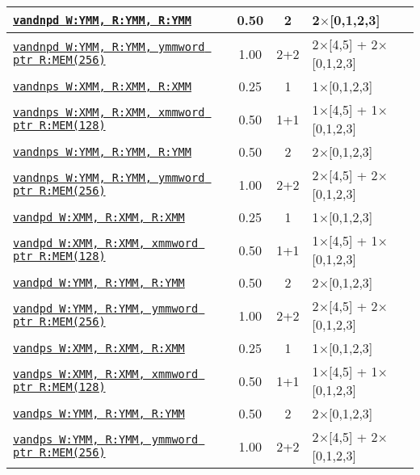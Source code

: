 \documentclass[a4paper,english,fontsize=9]{scrartcl}
\begin{document}
\begin{longtable}{p{}ccL{.25\textwidth}}
  \midrule
  \texttt{\href{https://felixcloutier.com/x86/ANDNPD.html}{vandnpd W:YMM, R:YMM, R:YMM}} & 0.50 & 2 & 2\(\times\)[0,1,2,3] \\
  \midrule
  \texttt{\href{https://felixcloutier.com/x86/ANDNPD.html}{vandnpd W:YMM, R:YMM, ymmword ptr R:MEM(256)}} & 1.00 & 2+2 & 2\(\times\)[4,5] + 2\(\times\)[0,1,2,3] \\
  \midrule
  \texttt{\href{https://felixcloutier.com/x86/ANDNPS.html}{vandnps W:XMM, R:XMM, R:XMM}} & 0.25 & 1 & 1\(\times\)[0,1,2,3] \\
  \midrule
  \texttt{\href{https://felixcloutier.com/x86/ANDNPS.html}{vandnps W:XMM, R:XMM, xmmword ptr R:MEM(128)}} & 0.50 & 1+1 & 1\(\times\)[4,5] + 1\(\times\)[0,1,2,3] \\
  \midrule
  \texttt{\href{https://felixcloutier.com/x86/ANDNPS.html}{vandnps W:YMM, R:YMM, R:YMM}} & 0.50 & 2 & 2\(\times\)[0,1,2,3] \\
  \midrule
  \texttt{\href{https://felixcloutier.com/x86/ANDNPS.html}{vandnps W:YMM, R:YMM, ymmword ptr R:MEM(256)}} & 1.00 & 2+2 & 2\(\times\)[4,5] + 2\(\times\)[0,1,2,3] \\
  \midrule
  \texttt{\href{https://felixcloutier.com/x86/ANDPD.html}{vandpd W:XMM, R:XMM, R:XMM}} & 0.25 & 1 & 1\(\times\)[0,1,2,3] \\
  \midrule
  \texttt{\href{https://felixcloutier.com/x86/ANDPD.html}{vandpd W:XMM, R:XMM, xmmword ptr R:MEM(128)}} & 0.50 & 1+1 & 1\(\times\)[4,5] + 1\(\times\)[0,1,2,3] \\
  \midrule
  \texttt{\href{https://felixcloutier.com/x86/ANDPD.html}{vandpd W:YMM, R:YMM, R:YMM}} & 0.50 & 2 & 2\(\times\)[0,1,2,3] \\
  \midrule
  \texttt{\href{https://felixcloutier.com/x86/ANDPD.html}{vandpd W:YMM, R:YMM, ymmword ptr R:MEM(256)}} & 1.00 & 2+2 & 2\(\times\)[4,5] + 2\(\times\)[0,1,2,3] \\
  \midrule
  \texttt{\href{https://felixcloutier.com/x86/ANDPS.html}{vandps W:XMM, R:XMM, R:XMM}} & 0.25 & 1 & 1\(\times\)[0,1,2,3] \\
  \midrule
  \texttt{\href{https://felixcloutier.com/x86/ANDPS.html}{vandps W:XMM, R:XMM, xmmword ptr R:MEM(128)}} & 0.50 & 1+1 & 1\(\times\)[4,5] + 1\(\times\)[0,1,2,3] \\
  \midrule
  \texttt{\href{https://felixcloutier.com/x86/ANDPS.html}{vandps W:YMM, R:YMM, R:YMM}} & 0.50 & 2 & 2\(\times\)[0,1,2,3] \\
  \midrule
  \texttt{\href{https://felixcloutier.com/x86/ANDPS.html}{vandps W:YMM, R:YMM, ymmword ptr R:MEM(256)}} & 1.00 & 2+2 & 2\(\times\)[4,5] + 2\(\times\)[0,1,2,3] \\

\end{longtable}
\end{document}
